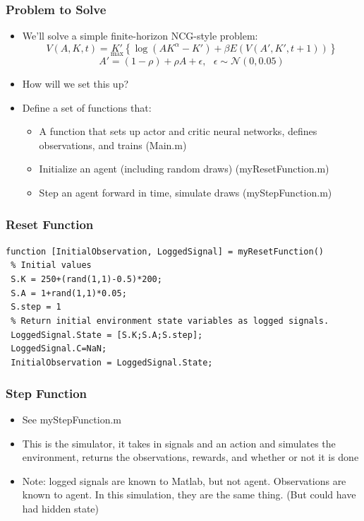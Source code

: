 \documentclass{beamer}
\begin{document}
\begin{frame}
\frametitle[alignment=center]{Problem to Solve}
\begin{itemize}
\item We'll solve a simple finite-horizon NCG-style problem:
$$V(A,K,t)=\underset{\max}{K'}\left\{\log(A K^{\alpha}-K')+\beta E(V(A',K',t+1))\right\}$$
$$A'=(1-\rho)+\rho A+\epsilon,\ \ \ \epsilon\sim\mathcal{N}(0,0.05)$$
\item How will we set this up?
\bigskip
\item Define a set of functions that:
\bigskip
\begin{itemize}
\item A function that sets up actor and critic neural networks, defines observations, and trains (Main.m)
\bigskip
\item Initialize an agent (including random draws) (myResetFunction.m)
\bigskip
\item Step an agent forward in time, simulate draws (myStepFunction.m)
\end{itemize}
\end{itemize}
\end{frame}


\begin{frame}
\frametitle[alignment=center]{Reset Function}
\texttt{function [InitialObservation, LoggedSignal] = myResetFunction()}\\
\texttt{ \% Initial values}\\
\texttt{    S.K = 250+(rand(1,1)-0.5)*200;}\\
 \texttt{   S.A = 1+rand(1,1)*0.05;}\\
\texttt{    S.step = 1}   \\
 \texttt{  \% Return initial environment state variables as logged signals.}\\
\texttt{    LoggedSignal.State = [S.K;S.A;S.step];}\\
\texttt{    LoggedSignal.C=NaN;}\\
\texttt{    InitialObservation = LoggedSignal.State;}
\end{frame}

\begin{frame}
\frametitle[alignment=center]{Step Function}
\begin{itemize}
\item See myStepFunction.m
\bigskip
\item This is the simulator, it takes in signals and an action and simulates the environment, returns the observations, rewards, and whether or not it is done
\bigskip
\item Note:  logged signals are known to Matlab, but not agent.  Observations are known to agent.  In this simulation, they are the same thing.  (But could have had hidden state)
\end{itemize}
\end{frame}
\end{document}
